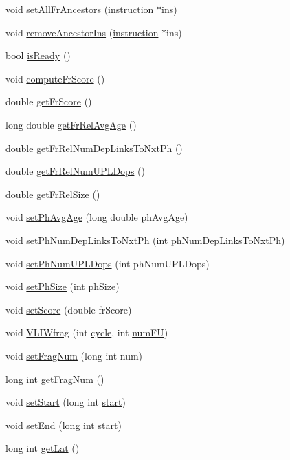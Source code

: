 \begin{DoxyCompactItemize}
\item 
void \hyperlink{classfragment_ad85462ff233b30289592d30a7f912e69}{setAllFrAncestors} (\hyperlink{classinstruction}{instruction} $\ast$ins)
\item 
void \hyperlink{classfragment_af7ddc8217902791945779675f4727181}{removeAncestorIns} (\hyperlink{classinstruction}{instruction} $\ast$ins)
\item 
bool \hyperlink{classfragment_abf56277a83dfaf8d9e772dc975f3d2c6}{isReady} ()
\item 
void \hyperlink{classfragment_aaedc29f218f89cf851a75ae3093ef0a3}{computeFrScore} ()
\item 
double \hyperlink{classfragment_af8b6f798c7514a296855ba3032df9149}{getFrScore} ()
\item 
long double \hyperlink{classfragment_ac9b66a971cbeae791ce85b5939b40595}{getFrRelAvgAge} ()
\item 
double \hyperlink{classfragment_a77dbeb3aff85e771b16a3d9af59cb13f}{getFrRelNumDepLinksToNxtPh} ()
\item 
double \hyperlink{classfragment_aeedd611d7a3bdf4699b0fb64d85fb6b3}{getFrRelNumUPLDops} ()
\item 
double \hyperlink{classfragment_a8693d4747ded8fc10f1356aa5558c232}{getFrRelSize} ()
\item 
void \hyperlink{classfragment_a9b5625e3a82798624e16a747baf93078}{setPhAvgAge} (long double phAvgAge)
\item 
void \hyperlink{classfragment_a98217830bdd67193cc3cd784b427a15e}{setPhNumDepLinksToNxtPh} (int phNumDepLinksToNxtPh)
\item 
void \hyperlink{classfragment_a9614895d86593a6967506e1c424a46ef}{setPhNumUPLDops} (int phNumUPLDops)
\item 
void \hyperlink{classfragment_ae2cf355111d2112a3f388b8749a3bddb}{setPhSize} (int phSize)
\item 
void \hyperlink{classfragment_a0d271d84f4f7dc3fc50f92ff84bcc38a}{setScore} (double frScore)
\item 
void \hyperlink{classfragment_aec9f0320f42a1417a2fb59c57df575f2}{VLIWfrag} (int \hyperlink{vliwScheduler_8cpp_a1f4871d45089b039d95d3832dd123827}{cycle}, int \hyperlink{phraseGen_8cpp_ae0b3cf4db09e8c26c2ab03dbe18bfb19}{numFU})
\item 
void \hyperlink{classfragment_a6159b12f01d9a5214aa35c6612a58316}{setFragNum} (long int num)
\item 
long int \hyperlink{classfragment_ae9387817bc211427231780adf9973fe4}{getFragNum} ()
\item 
void \hyperlink{classfragment_a50d5fb572b0336f5c4fd28f3f4877d97}{setStart} (long int \hyperlink{bkEnd_8cpp_ada310e7f72b38fadd4b24d80ed3438ee}{start})
\item 
void \hyperlink{classfragment_a8de0712e74090643f9a65862b296b995}{setEnd} (long int \hyperlink{bkEnd_8cpp_ada310e7f72b38fadd4b24d80ed3438ee}{start})
\item 
long int \hyperlink{classfragment_a5e3e805070f60f4498372e304835d162}{getLat} ()
\end{DoxyCompactItemize}


